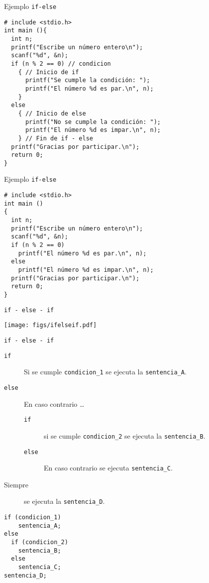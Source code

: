 \documentclass[xcolor={usenames,svgnames,dvipsnames}, aspectratio=169]{beamer}
\begin{document}
\begin{frame}[label={sec:org0f321b2},fragile,plain]{Ejemplo \texttt{if-else}}
 \lstset{language=C,label= ,caption= ,captionpos=b,numbers=none}
\begin{lstlisting}
# include <stdio.h>
int main (){
  int n;
  printf("Escribe un número entero\n");
  scanf("%d", &n);
  if (n % 2 == 0) // condicion
    { // Inicio de if 
      printf("Se cumple la condición: ");
      printf("El número %d es par.\n", n);      
    }
  else
    { // Inicio de else
      printf("No se cumple la condición: ");
      printf("El número %d es impar.\n", n);      
    } // Fin de if - else
  printf("Gracias por participar.\n");
  return 0;
}
\end{lstlisting}
\end{frame}

\begin{frame}[label={sec:org12d3148},fragile]{Ejemplo \texttt{if-else}}
 \lstset{language=C,label= ,caption= ,captionpos=b,numbers=none}
\begin{lstlisting}
# include <stdio.h>
int main ()
{
  int n;
  printf("Escribe un número entero\n");
  scanf("%d", &n);
  if (n % 2 == 0)
    printf("El número %d es par.\n", n);
  else
    printf("El número %d es impar.\n", n);
  printf("Gracias por participar.\n");
  return 0;
}
\end{lstlisting}
\end{frame}


\begin{frame}[label={sec:org8cd0f47},fragile]{\texttt{if - else - if}}
 \begin{center}
\texttt{[image: figs/ifelseif.pdf]}
\end{center}
\end{frame}
\begin{frame}[label={sec:orgce2c592},fragile]{\texttt{if - else - if}}
 \begin{description}
\item[{\texttt{if}}] Si se cumple \texttt{condicion\_1} se ejecuta la \texttt{sentencia\_A}.
\item[{\texttt{else}}] En caso contrario \ldots{}
\begin{description}
\item[{\texttt{if}}] si se cumple \texttt{condicion\_2} se ejecuta la \texttt{sentencia\_B}.
\item[{\texttt{else}}] En caso contrario se ejecuta \texttt{sentencia\_C}.
\end{description}
\item[{Siempre}] se ejecuta la \texttt{sentencia\_D}.
\end{description}
\lstset{language=C,label= ,caption= ,captionpos=b,numbers=none}
\begin{lstlisting}
if (condicion_1)
    sentencia_A;
else
  if (condicion_2)
    sentencia_B;
  else
    sentencia_C;
sentencia_D;
\end{lstlisting}
\end{frame}
\end{document}
